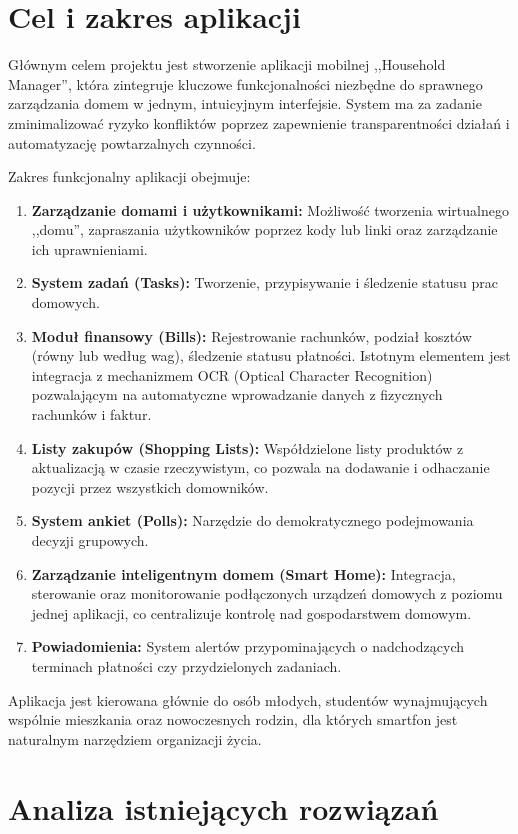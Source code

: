 \section{Cel i zakres aplikacji}

Głównym celem projektu jest stworzenie aplikacji mobilnej ,,Household Manager'', która zintegruje kluczowe funkcjonalności niezbędne do sprawnego zarządzania domem w jednym, intuicyjnym interfejsie. System ma za zadanie zminimalizować ryzyko konfliktów poprzez zapewnienie transparentności działań i automatyzację powtarzalnych czynności.

Zakres funkcjonalny aplikacji obejmuje:
\begin{enumerate}
    \item \textbf{Zarządzanie domami i użytkownikami:} Możliwość tworzenia wirtualnego ,,domu'', zapraszania użytkowników poprzez kody lub linki oraz zarządzanie ich uprawnieniami.
    \item \textbf{System zadań (Tasks):} Tworzenie, przypisywanie i śledzenie statusu prac domowych.
    \item \textbf{Moduł finansowy (Bills):} Rejestrowanie rachunków, podział kosztów (równy lub według wag), śledzenie statusu płatności. Istotnym elementem jest integracja z mechanizmem OCR (Optical Character Recognition) pozwalającym na automatyczne wprowadzanie danych z fizycznych rachunków i faktur.
    \item \textbf{Listy zakupów (Shopping Lists):} Współdzielone listy produktów z aktualizacją w czasie rzeczywistym, co pozwala na dodawanie i odhaczanie pozycji przez wszystkich domowników.
    \item \textbf{System ankiet (Polls):} Narzędzie do demokratycznego podejmowania decyzji grupowych.
    \item \textbf{Zarządzanie inteligentnym domem (Smart Home):} Integracja, sterowanie oraz monitorowanie podłączonych urządzeń domowych z poziomu jednej aplikacji, co centralizuje kontrolę nad gospodarstwem domowym.
    \item \textbf{Powiadomienia:} System alertów przypominających o nadchodzących terminach płatności czy przydzielonych zadaniach.
\end{enumerate}

Aplikacja jest kierowana głównie do osób młodych, studentów wynajmujących wspólnie mieszkania oraz nowoczesnych rodzin, dla których smartfon jest naturalnym narzędziem organizacji życia.

\section{Analiza istniejących rozwiązań}

